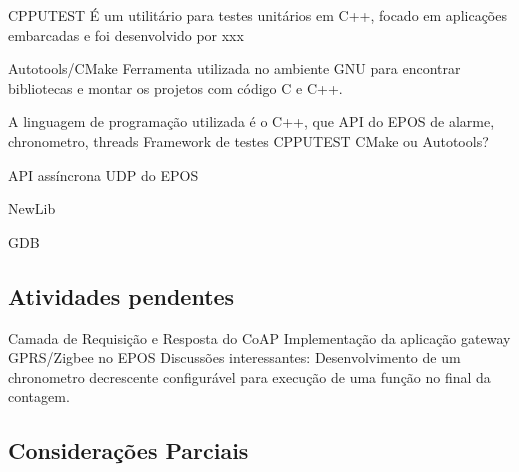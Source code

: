 CPPUTEST
É um utilitário para testes unitários em C++, focado em aplicações embarcadas e foi desenvolvido por xxx

Autotools/CMake
Ferramenta utilizada no ambiente GNU para encontrar bibliotecas e montar os projetos com código C e C++.

A linguagem de programação utilizada é o C++, que API do EPOS de alarme, chronometro, threads
Framework de testes CPPUTEST CMake ou Autotools?

API assíncrona UDP do EPOS

NewLib

GDB

\subsection{Atividades pendentes}
Camada de Requisição e Resposta do CoAP
Implementação da aplicação gateway GPRS/Zigbee no EPOS
Discussões interessantes:
Desenvolvimento de um chronometro decrescente configurável para execução de uma função no final da contagem.


\subsection{Considerações Parciais}
